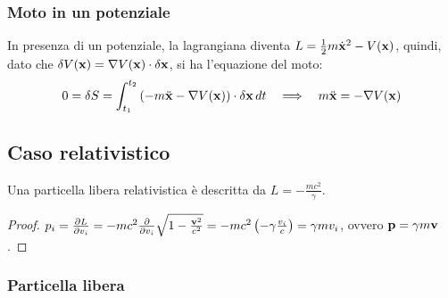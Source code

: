 \subsubsection{Moto in un potenziale}

In presenza di un potenziale, la lagrangiana diventa $ L = \frac{1}{2} m \dot{\mathbf{x}}^2 - V(\mathbf{x}) $, quindi, dato che $ \delta V(\mathbf{x}) = \nabla V(\mathbf{x}) \cdot \delta\mathbf{x} $, si ha l'equazione del moto:
\begin{equation}
	0 = \delta S = \int_{t_1}^{t_2} \left( - m\ddot{\mathbf{x}} - \nabla V(\mathbf{x}) \right) \cdot \delta\mathbf{x} \,dt \quad\Longrightarrow\quad m\ddot{\mathbf{x}} = - \nabla V(\mathbf{x})
	\label{eq:5.4}
\end{equation}

\subsection{Caso relativistico}

\begin{proposition}
	Una particella libera relativistica è descritta da $ L = - \frac{m c^2}{\gamma} $.
\end{proposition}
\begin{proof}
	$ p_i = \frac{\partial L}{\partial v_i} = - mc^2 \frac{\partial}{\partial v_i} \sqrt{1 - \frac{\mathbf{v}^2}{c^2}} = -mc^2 \left( -  \gamma \frac{v_i}{c} \right) = \gamma m v_i $, ovvero $ \mathbf{p} = \gamma m \mathbf{v} $.
\end{proof}

\subsubsection{Particella libera}

